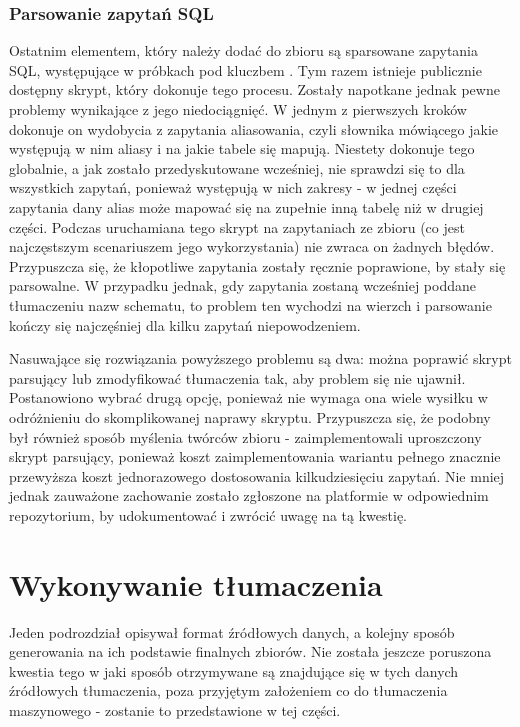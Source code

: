 \subsubsection{Parsowanie zapytań SQL}
Ostatnim elementem, który należy dodać do zbioru są sparsowane zapytania SQL, występujące w próbkach pod kluczbem . Tym razem istnieje publicznie dostępny skrypt, który dokonuje tego procesu. Zostały napotkane jednak pewne problemy wynikające z jego niedociągnięć. W jednym z pierwszych kroków dokonuje on wydobycia z zapytania aliasowania, czyli słownika mówiącego jakie występują w nim aliasy i na jakie tabele się mapują. Niestety dokonuje tego globalnie, a jak zostało przedyskutowane wcześniej, nie sprawdzi się to dla wszystkich zapytań, ponieważ występują w nich zakresy - w jednej części zapytania dany alias może mapować się na zupełnie inną tabelę niż w drugiej części. Podczas uruchamiana tego skrypt na zapytaniach ze zbioru  (co jest najczęstszym scenariuszem jego wykorzystania) nie zwraca on żadnych błędów. Przypuszcza się, że kłopotliwe zapytania zostały ręcznie poprawione, by stały się parsowalne. W przypadku jednak, gdy zapytania zostaną wcześniej poddane tłumaczeniu nazw schematu, to problem ten wychodzi na wierzch i parsowanie kończy się najczęśniej dla kilku zapytań niepowodzeniem. 

Nasuwające się rozwiązania powyższego problemu są dwa: można poprawić skrypt parsujący lub zmodyfikować tłumaczenia tak, aby problem się nie ujawnił. Postanowiono wybrać drugą opcję, ponieważ nie wymaga ona wiele wysiłku w odróżnieniu do skomplikowanej naprawy skryptu. Przypuszcza się, że podobny był również sposób myślenia twórców zbioru  - zaimplementowali uproszczony skrypt parsujący, ponieważ koszt zaimplementowania wariantu pełnego znacznie przewyższa koszt jednorazowego dostosowania kilkudziesięciu zapytań. Nie mniej jednak zauważone zachowanie zostało zgłoszone na platformie  w odpowiednim repozytorium, by udokumentować i zwrócić uwagę na tą kwestię.

\section{Wykonywanie tłumaczenia}
Jeden podrozdział opisywał format źródłowych danych, a kolejny sposób generowania na ich podstawie finalnych zbiorów. Nie została jeszcze poruszona kwestia tego w jaki sposób otrzymywane są znajdujące się w tych danych źródłowych tłumaczenia, poza przyjętym założeniem co do tłumaczenia maszynowego - zostanie to przedstawione w tej części.

